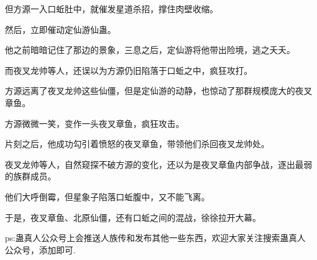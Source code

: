 \begin{this_body}
但方源一入口蚯肚中，就催发星道杀招，撑住肉壁收缩。

然后，立即催动定仙游仙蛊。

他之前暗暗记住了那边的景象，三息之后，定仙游将他带出险境，逃之夭夭。

而夜叉龙帅等人，还误以为方源仍旧陷落于口蚯之中，疯狂攻打。

方源远离了夜叉龙帅这些仙僵，但是定仙游的动静，也惊动了那群规模庞大的夜叉章鱼。

方源微微一笑，变作一头夜叉章鱼，疯狂攻击。

片刻之后，他成功勾引着愤怒的夜叉章鱼，带领他们杀回夜叉龙帅处。

夜叉龙帅等人，自然窥探不破方源的变化，还以为是夜叉章鱼内部争战，逐出最弱的族群成员。

他们大呼倒霉，但星象子陷落口蚯腹中，又不能飞离。

于是，夜叉章鱼、北原仙僵，还有口蚯之间的混战，徐徐拉开大幕。

ps:蛊真人公众号上会推送人族传和发布其他一些东西，欢迎大家关注搜索蛊真人公众号，添加即可.

\end{this_body}

